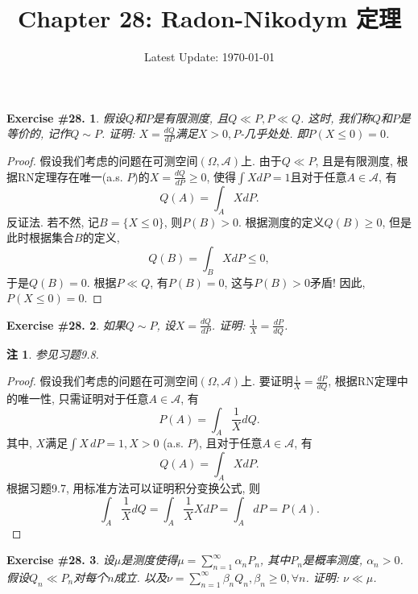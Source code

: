 \documentclass[UTF8, a4paper]{article}
\title{Chapter 28: Radon-Nikodym 定理}
\author{}
\date{Latest Update: \today}
\newtheorem{exercise}{Exercise \#28.}
\newtheorem*{remark}{注}
\begin{document}
\maketitle

\begin{framed}
\begin{exercise}
假设\(Q\)和\(P\)是有限测度, 且\(Q \ll P, P \ll Q\). 这时, 我们称\(Q\)和\(P\)是等价的, 记作\(Q \sim P\). 证明: \(X = \frac{dQ}{dP}\)满足\(X > 0, P\)-几乎处处.
即\(P(X \leq 0) = 0\).
\end{exercise}
\end{framed}

\begin{proof}
假设我们考虑的问题在可测空间\((\Omega, \mathcal{A})\)上. 
由于\(Q \ll P\), 且是有限测度, 
根据RN定理存在唯一(a.s. \(P\))的\(X = \frac{dQ}{dP} \geq 0\), 使得\(\int X dP = 1\)且对于任意\(A \in \mathcal{A}\), 有
\[
Q(A) = \int_A X dP.
\]
反证法. 若不然, 记\(B = \{X \leq 0\}\), 则\(P(B) > 0\). 
根据测度的定义\(Q(B) \geq 0\),
但是此时根据集合\(B\)的定义, 
$$
Q(B) = \int_B X dP \leq 0,
$$
于是\(Q(B) = 0\). 根据\(P \ll Q\), 有\(P(B) = 0\), 这与\(P(B) > 0\)矛盾! 因此, \(P(X \leq 0) = 0\).
\end{proof}

\begin{framed}
\begin{exercise}
如果\(Q \sim P\), 设\(X = \frac{dQ}{dP}\). 证明: \(\frac{1}{X} = \frac{dP}{dQ}\).
\end{exercise}
\end{framed}
\begin{remark}
参见习题9.8.
\end{remark}


\begin{proof}
假设我们考虑的问题在可测空间\((\Omega, \mathcal{A})\)上. 
要证明\(\frac{1}{X} = \frac{dP}{dQ}\), 根据RN定理中的唯一性, 只需证明对于任意\(A \in \mathcal{A}\), 有
$$
P(A) = \int_A \frac{1}{X} dQ.
$$
其中, \(X\)满足\(\int X \,dP = 1, X > 0\) (a.s. \(P\)), 且对于任意\(A \in \mathcal{A}\), 有
\[
Q(A) = \int_A X dP.
\]
根据习题9.7, 用标准方法可以证明积分变换公式, 则
$$
\int_A \frac{1}{X} dQ = \int_A \frac{1}{X} X dP = \int_A dP = P(A).
$$
\end{proof}


\begin{framed}
\begin{exercise}
设\(\mu\)是测度使得\(\mu = \sum_{n=1}^{\infty} \alpha_n P_n\), 其中\(P_n\)是概率测度, \(\alpha_n > 0\).
假设\(Q_n \ll P_n\)对每个\(n\)成立. 以及\(\nu = \sum_{n=1}^{\infty} \beta_n Q_n, \beta_n \geq 0, \forall n\).
证明: \(\nu \ll \mu\).
\end{exercise}
\end{framed}
\end{document}
